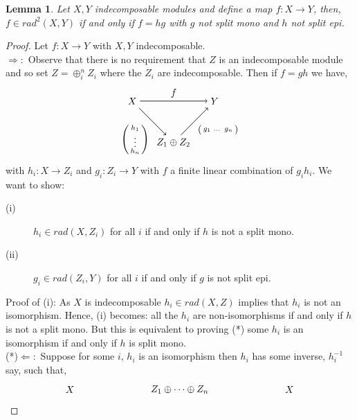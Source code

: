 \documentclass[11.5pt, twoside, a4paper, titlepage]{report}
\theoremstyle{definition}
\theoremstyle{plain}
\newtheorem{lem}[mydef]{Lemma}
\begin{document}
\begin{lem} \label{rad2lem}
Let $X,Y$ indecomposable modules and define a map $f: X \to Y$, then, $f \in rad^2(X,Y)$ if and only if $f=hg$ with $g$ not split mono and $h$ not split epi.
\end{lem}
\begin{proof}
Let $f: X \to Y$ with $X,Y$ indecomposable.\\
$\Rightarrow:$ Observe that there is no requirement that $Z$ is an indecomposable module and so set $Z=\oplus^n_i Z_i$ where the $Z_i$ are indecomposable. Then if $f=gh$ we have,
\begin{equation*} 
\begin{tikzpicture}[->,-latex, auto, main path/.style={->, semithick}, main node/.style={}]
\node	[main node]		(1) at (0,0)		{$X$};
\node [main node]		(2) at (3,0)		{$Y$};
\node [main node]		(3) at (1.5,-1.5)	{$Z_1 \oplus Z_2$};

\draw (1) [main path] edge node [auto] {$f$} (2);
\draw (1) [main path] edge node [auto, swap] {$\left(\begin{smallmatrix} h_1\\ \vdots \\ h_n \end{smallmatrix}\right)$} (3);
\draw (3) [main path] edge node [auto, swap] {$\left(\begin{smallmatrix}g_1 & \dots & g_n \end{smallmatrix}\right)$} (2);
\end{tikzpicture}
\end{equation*}
with $h_i: X \to Z_i$ and $g_i: Z_i \to Y$ with $f$ a finite linear combination of $g_ih_i$. We want to show:
\begin{description}
\item [(i)] $h_i \in rad(X,Z_i)$ for all $i$ if and only if $h$ is not a split mono.
\item [(ii)] $g_i \in rad(Z_i,Y)$ for all $i$ if and only if $g$ is not split epi.
\end{description}
Proof of (i): As $X$ is indecomposable $h_i \in rad(X,Z)$ implies that $h_i$ is not an isomorphism. Hence, (i) becomes: all the $h_i$ are non-isomorphisms if and only if $h$ is not a split mono. But this is equivalent to proving (*) some $h_i$ is an isomorphism if and only if $h$ is split mono. \\
(*)$\Leftarrow:$ Suppose for some $i$, $h_i$ is an isomorphism then $h_i$ has some inverse, $h_i^{-1}$ say, such that,
\begin{equation*} 
\begin{tikzpicture}[->,-latex, auto, main path/.style={->, semithick}, main node/.style={}]
\node	[main node]		(1) at (0,0)		{$X$};
\node [main node]		(2) at (4,0)		{$Z_1\oplus \dots \oplus Z_n$};
\node [main node]		(3) at (8,0)		{$X$};


\end{tikzpicture}
\end{equation*}
\end{proof}
\end{document}
